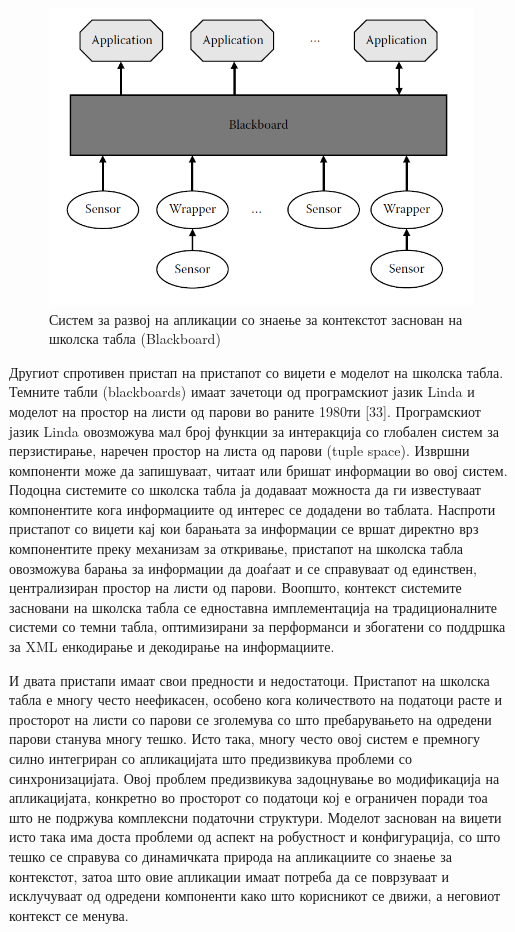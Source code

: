 \begin{figure}[htb]
\centering
\includegraphics[scale=0.4]{images/blackboard}
\caption{Систем за развој на апликации со знаење за контекстот заснован на
школска табла (Blackboard)}
\label{fig:blackboard}
\end{figure}
 
Другиот спротивен пристап на пристапот со виџети е моделот на школска табла.
Темните табли (blackboards) имаат зачетоци од програмскиот јазик Linda и моделот
на простор на листи од парови во раните 1980ти [33]. Програмскиот јазик Linda
овозможува мал број функции за интеракција со глобален систем за перзистирање,
наречен простор на листа од парови (tuple space). Извршни компоненти може да
запишуваат, читаат или бришат информации во овој систем. Подоцна системите со
школска табла ја додаваат можноста да ги известуваат компонентите кога
информациите од интерес се додадени во таблата. Наспроти пристапот со виџети кај
кои барањата за информации се вршат директно врз компонентите преку механизам за
откривање, пристапот на школска табла овозможува барања за информации да доаѓаат
и се справуваат од единствен, централизиран простор на листи од парови. Воопшто,
контекст системите засновани на школска табла се едноставна имплементација на
традиционалните системи со темни табла, оптимизирани за перформанси и збогатени
со поддршка за XML енкодирање и декодирање на информациите.

И двата пристапи имаат свои предности и недостатоци. Пристапот на школска табла
е многу често неефикасен, особено кога количеството на податоци расте и
просторот на листи со парови се зголемува со што пребарувањето на одредени
парови станува многу тешко. Исто така, многу често овој систем е премногу силно
интегриран со апликацијата што предизвикува проблеми со синхронизацијата. Овој
проблем предизвикува задоцнување во модификација на апликацијата, конкретно во
просторот со податоци кој е ограничен поради тоа што не подржува комплексни
податочни структури. Моделот заснован на виџети исто така има доста проблеми од
аспект на робустност и конфигурација, со што тешко се справува со динамичката
природа на апликациите со знаење за контекстот, затоа што овие апликации имаат
потреба да се поврзуваат и исклучуваат од одредени компоненти како што
корисникот се движи, а неговиот контекст се менува.

